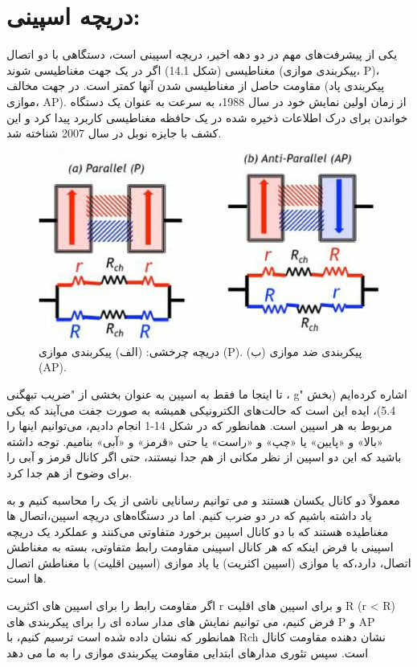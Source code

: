 \section{دریچه اسپینی:}
یکی از پیشرفت‌های مهم در دو دهه اخیر، دریچه اسپینی  است، دستگاهی با دو اتصال مغناطیسی (شکل 14.1) اگر در یک جهت مغناطیسی شوند (پیکربندی موازی، P)، مقاومت حاصل از مغناطیسی شدن آنها کمتر است. در جهت مخالف (پیکربندی پاد موازی، AP). از زمان اولین نمایش خود در سال 1988، به سرعت به عنوان یک دستگاه خواندن برای درک اطلاعات ذخیره شده در یک حافظه مغناطیسی کاربرد پیدا کرد و این کشف با جایزه نوبل در سال 2007 شناخته شد.
\begin{figure}[!ht]
  \includegraphics[width=1\linewidth]{./figures/spinvalve.png}
  \caption{دریچه چرخشی: (الف) پیکربندی موازی (P). (ب) پیکربندی ضد موازی (AP).}
\end{figure}
تا اینجا ما فقط به اسپین به عنوان بخشی از "ضریب تبهگنی ، g" اشاره کرده‌ایم (بخش 5.4)، ایده این است که حالت‌های الکترونیکی همیشه به صورت جفت می‌آیند که یکی مربوط به هر اسپین است. همانطور که در شکل 14-1 انجام دادیم، می‌توانیم اینها را «بالا» و «پایین» یا «چپ» و «راست» یا حتی «قرمز» و «آبی» بنامیم. توجه داشته باشید که این دو اسپین از نظر مکانی از هم جدا نیستند، حتی اگر کانال قرمز و آبی را برای وضوح از هم جدا کرد.

معمولاً دو کانال یکسان هستند و می توانیم رسانایی ناشی از یک را محاسبه کنیم و به یاد داشته باشیم که در دو ضرب کنیم. اما در دستگاه‌های دریچه اسپین،اتصال ها مغناطیده هستند که با دو کانال اسپین برخورد متفاوتی می‌کنند و عملکرد یک دریچه اسپینی با فرض اینکه که هر کانال اسپینی مقاومت رابط  متفاوتی، بسته به مغناطش اتصال، دارد،که یا موازی (اسپین اکثریت) یا پاد موازی (اسپین اقلیت) با مغناطش اتصال ها است.

اگر مقاومت رابط را برای اسپین های اکثریت r و برای اسپین های اقلیت R (r < R) فرض کنیم، می توانیم نمایش های مدار ساده ای را برای پیکربندی های P و AP همانطور که نشان داده شده است ترسیم کنیم، با Rch نشان دهنده مقاومت کانال است. سپس تئوری مدارهای ابتدایی مقاومت پیکربندی موازی را به ما می دهد

